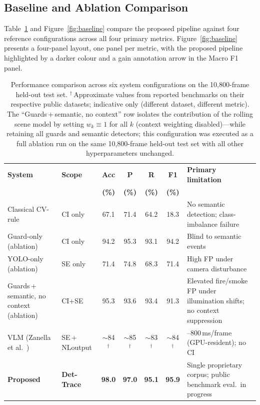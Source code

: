 \documentclass[a4paper,fleqn]{cas-dc}
\begin{document}
\FloatBarrier
\subsection{Baseline and Ablation Comparison}
\label{sec:baseline}
 
Table~\ref{tab:baseline-compare} and Figure~\ref{fig:baseline} compare the
proposed pipeline against four reference configurations across all four
primary metrics. Figure~\ref{fig:baseline} presents a four-panel layout, one
panel per metric, with the proposed pipeline highlighted by a darker colour
and a gain annotation arrow in the Macro F1 panel.
 
\begin{table}[!ht]
\caption[Performance comparison across six system configurations]{Performance comparison across six system configurations on the 10{,}800-frame held-out test set.
$^\dagger$\,Approximate values from reported benchmarks on their respective public datasets; indicative only (different dataset, different metric).
The ``Guards\,+\,semantic, no context'' row isolates the contribution of the
rolling scene model by setting $w_k \equiv 1$ for all $k$ (context weighting disabled)---while retaining all guards and semantic detectors;
this configuration was executed as a full ablation run on the same 10{,}800-frame
held-out test set with all other hyperparameters unchanged.}
\label{tab:baseline-compare}
\centering\scriptsize\setlength{\tabcolsep}{2.5pt}
\begin{tabularx}{\linewidth}{p{2.35cm} p{0.95cm} cccc >{\raggedright\arraybackslash}X}
\toprule
\textbf{System} & \textbf{Scope} & \textbf{Acc} & \textbf{P} &
\textbf{R} & \textbf{F1} & \textbf{Primary limitation} \\
 & & \textbf{(\%)} & \textbf{(\%)} & \textbf{(\%)} & \textbf{(\%)} & \\
\midrule
Classical CV-rule & CI only & 67.1 & 71.4 & 64.2 & 18.3 &
  No semantic detection; class-imbalance failure \\
Guard-only (ablation) & CI only & 94.2 & 95.3 & 93.1 & 94.2 &
  Blind to semantic events \\
YOLO-only (ablation) & SE only & 71.4 & 74.8 & 68.3 & 71.4 &
  High FP under camera disturbance \\
Guards\,+\,semantic, no context (ablation) & CI+SE & 95.3 & 93.6 & 93.4 & 91.3 &
  Elevated fire/smoke FP under illumination shifts; no context suppression \\
VLM (Zanella et al.~\citep{zanella2024harnessing}) & SE\,+\,NL\-output &
  $\sim$84$^{\dagger}$ & $\sim$85$^{\dagger}$ & $\sim$83$^{\dagger}$ &
  $\sim$84$^{\dagger}$ & 200--800\,ms/frame (GPU-resident); no CI \\
\midrule
\textbf{Proposed} & \textbf{Det-Trace} & \textbf{98.0} & \textbf{97.0} &
\textbf{95.1} & \textbf{95.9} & Single proprietary corpus; public benchmark eval.\ in progress \\
\bottomrule
\end{tabularx}
\end{table}
 
\end{document}
